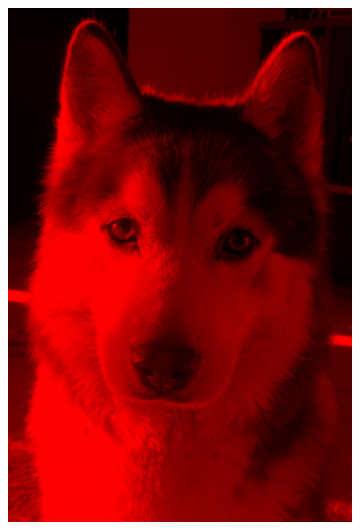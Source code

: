 \documentclass[12pt,utf8]{beamer}
\begin{document}
\begin{frame}
\begin{figure}
			\qquad\qquad\qquad
			\begin{subfigure}[b]{0.3\textwidth}
				\includegraphics[scale=0.07]{resources/doggo_red.jpg}
				

\end{subfigure}
\end{figure}
\end{frame}
\end{document}
